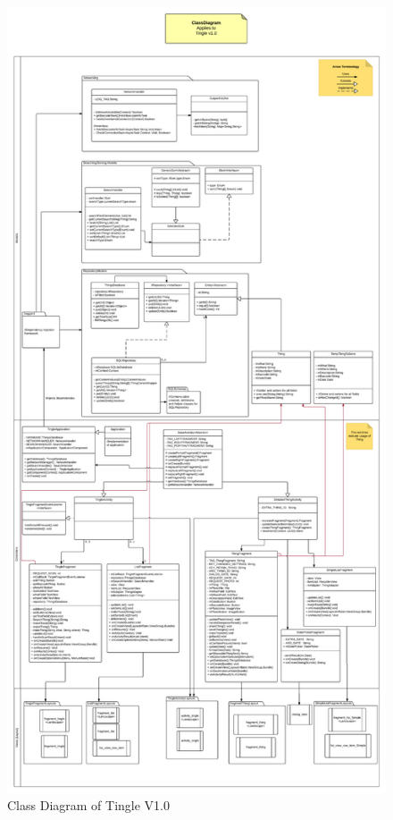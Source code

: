 \documentclass{article}
\begin{document}
\begin{figure}[h!]
	\centering
	\includegraphics[scale=0.4]{"TingleApp_ClassDiagram V1"}
	\caption{Class Diagram of Tingle V1.0}
	\label{fig:TingleApp_ClassDiagram V1}
\end{figure}
\end{document}
